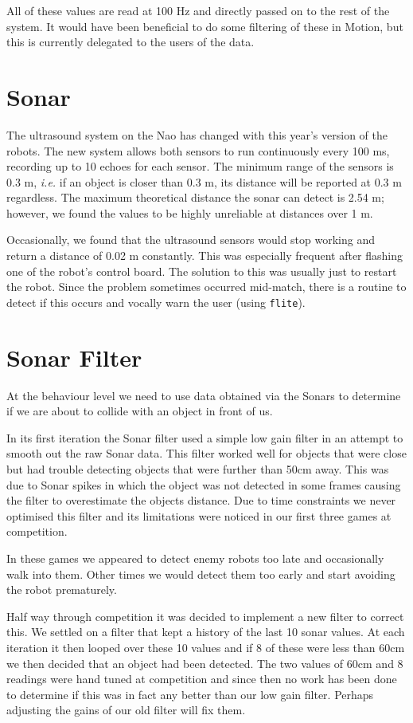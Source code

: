 \documentclass[pdftex,11pt,a4paper]{report}
\begin{document}
All of these values are read at 100 Hz and directly passed on to the rest
of the system. It would have been beneficial to do some filtering of these
in Motion, but this is currently delegated to the users of the data.

\section{Sonar}
The ultrasound system on the Nao has changed with this year's version of
the robots. The new system allows both sensors to run continuously every
100 ms, recording up to 10 echoes for each sensor. The minimum range of the
sensors is 0.3 m, \emph{i.e.} if an object is closer than 0.3 m, its
distance will be reported at 0.3 m regardless. The maximum theoretical
distance the sonar can detect is 2.54 m; however, we found the values to be
highly unreliable at distances over 1 m.

Occasionally, we found that the ultrasound sensors would stop working and
return a distance of 0.02 m constantly. This was especially frequent after
flashing one of the robot's control board. The solution to this was usually
just to restart the robot. Since the problem sometimes occurred mid-match,
there is a routine to detect if this occurs and vocally warn the user
(using \texttt{flite}).
\section{Sonar Filter \label{sectionSonarFilter}}
At the behaviour level we need to use data obtained via the Sonars to determine if we are about to collide with an object in front of us.

In its first iteration the Sonar filter used a simple low gain filter in an attempt to smooth out the raw Sonar data. This filter worked well for objects that were close but had trouble detecting objects that were further than 50cm away. This was due to Sonar spikes in which the object was not detected in some frames causing the filter to overestimate the objects distance. Due to time constraints we never optimised this filter and its limitations were noticed in our first three games at competition.

In these games we appeared to detect enemy robots too late and occasionally walk into them. Other times we would detect them too early and start avoiding the robot prematurely.

Half way through competition it was decided to implement a new filter to correct this. We settled on a filter that kept a history of the last 10 sonar values. At each iteration it then looped over these 10 values and if 8 of these were less than 60cm we then decided that an object had been detected. The two values of 60cm and 8 readings were hand tuned at competition and since then no work has been done to determine if this was in fact any better than our low gain filter. Perhaps adjusting the gains of our old filter will fix them.
\end{document}
